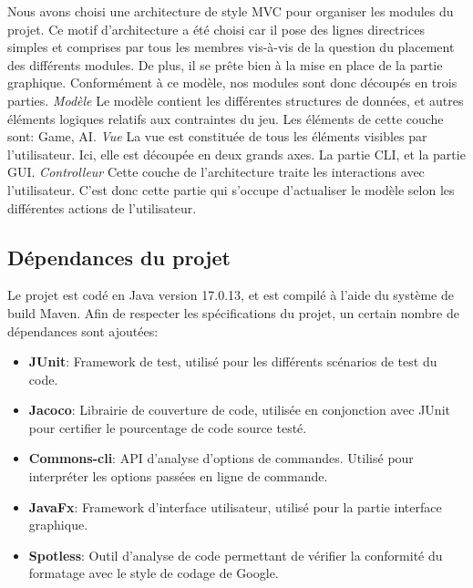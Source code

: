 \documentclass[a4paper,12pt]{article}
\begin{document}
Nous avons choisi une architecture de style MVC pour organiser les
modules du projet. Ce motif d'architecture a été choisi car il 
pose des lignes directrices simples et comprises par tous les membres
vis-à-vis de la question du placement des différents modules.
De plus, il se prête bien à la mise en place de la partie graphique.
Conformément à ce modèle, nos modules sont donc
découpés en trois parties.\newline
\textit{Modèle}\newline
Le modèle contient les différentes structures de données, 
et autres éléments logiques relatifs aux contraintes du jeu.
Les éléments de cette couche sont: Game, AI.\newline
\textit{Vue}\newline
La vue est constituée de tous les éléments visibles par 
l'utilisateur. Ici, elle est découpée en deux grands axes.
La partie CLI, et la partie GUI.\newline
\textit{Controlleur}\newline
Cette couche de l'architecture traite les interactions avec
l'utilisateur. C'est donc cette partie qui s'occupe d'actualiser
le modèle selon les différentes actions de l'utilisateur.

\subsection{Dépendances du projet}

Le projet est codé en Java version 17.0.13, et est compilé à l'aide du
système de build Maven. Afin de respecter les spécifications du
projet, un certain nombre de dépendances sont ajoutées:
\begin{itemize}
  \item \textbf{JUnit}: Framework de test, utilisé pour les
  différents scénarios de test du code.
  \item \textbf{Jacoco}: Librairie de couverture de code, utilisée
  en conjonction avec JUnit pour certifier le pourcentage de code
  source testé.
  \item \textbf{Commons-cli}: API d'analyse d'options de commandes.
  Utilisé pour interpréter les options passées en ligne de
  commande.
  \item \textbf{JavaFx}: Framework d'interface utilisateur, utilisé
  pour la partie interface graphique.
  \item \textbf{Spotless}: Outil d'analyse de code permettant de
  vérifier la conformité du formatage avec le style de codage de 
  Google.
\end{itemize}
\end{document}
